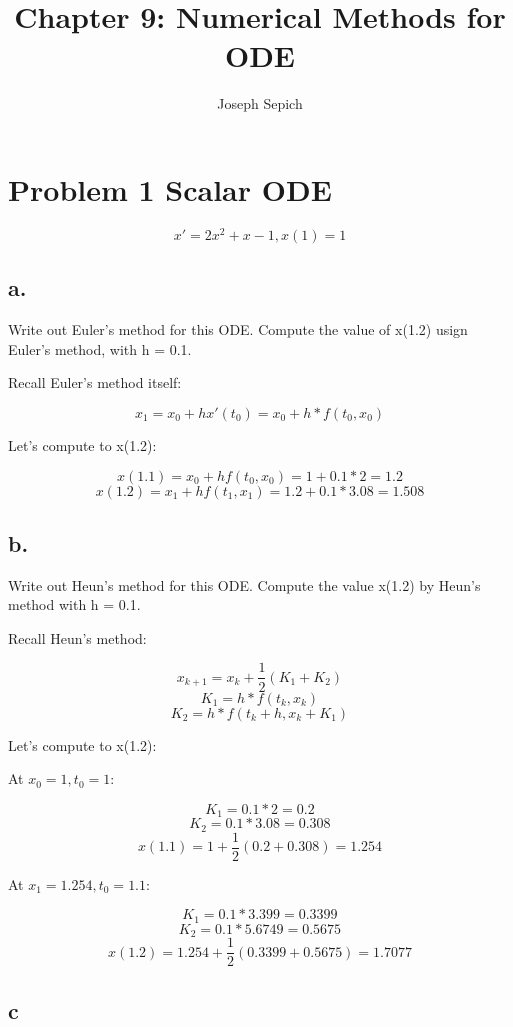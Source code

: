 \documentclass[]{article}
\title{Chapter 9: Numerical Methods for ODE}
\subtitle{Joseph Sepich}
\author{}
\date{}
\begin{document}
\maketitle

{
\setcounter{tocdepth}{2}
\tableofcontents
}
\section{Problem 1 Scalar ODE}\label{problem-1-scalar-ode}

\[x' = 2x^2 + x - 1, x(1) = 1\]

\subsection{a.}\label{a.}

Write out Euler's method for this ODE. Compute the value of x(1.2) usign
Euler's method, with h = 0.1.

Recall Euler's method itself:

\[x_1 = x_0 + hx'(t_0) = x_0 + h*f(t_0,x_0)\]

Let's compute to x(1.2):

\[x(1.1) = x_0 + hf(t_0,x_0) = 1 + 0.1 * 2 = 1.2\]
\[x(1.2) = x_1 + hf(t_1,x_1) = 1.2 + 0.1 * 3.08 = 1.508\]

\subsection{b.}\label{b.}

Write out Heun's method for this ODE. Compute the value x(1.2) by Heun's
method with h = 0.1.

Recall Heun's method:

\[x_{k+1} = x_k + \frac12(K_1 + K_2)\] \[K_1 = h*f(t_k, x_k)\]
\[K_2 = h*f(t_k + h, x_k + K_1)\]

Let's compute to x(1.2):

At \(x_0 = 1, t_0 = 1\):

\[K_1 = 0.1 * 2 = 0.2\] \[K_2 = 0.1 * 3.08 = 0.308\]
\[x(1.1) = 1 + \frac12(0.2 + 0.308) = 1.254\]

At \(x_1 = 1.254, t_0 = 1.1\):

\[K_1 = 0.1 * 3.399 = 0.3399\] \[K_2 = 0.1 * 5.6749 = 0.5675\]
\[x(1.2) = 1.254 + \frac12(0.3399 + 0.5675) = 1.7077\]

\subsection{c}\label{c}
\end{document}
